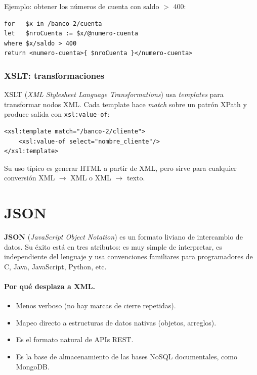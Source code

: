 \documentclass[11pt,a4paper]{article}
\begin{document}
Ejemplo: obtener los números de cuenta con saldo $>$ 400:

\begin{lstlisting}
for   $x in /banco-2/cuenta
let   $nroCuenta := $x/@numero-cuenta
where $x/saldo > 400
return <numero-cuenta>{ $nroCuenta }</numero-cuenta>
\end{lstlisting}

\subsubsection*{XSLT: transformaciones}

XSLT (\emph{XML Stylesheet Language Transformations}) usa
\emph{templates} para transformar nodos XML. Cada template hace
\emph{match} sobre un patrón XPath y produce salida con
\texttt{xsl:value-of}:

\begin{lstlisting}
<xsl:template match="/banco-2/cliente">
    <xsl:value-of select="nombre_cliente"/>
</xsl:template>
\end{lstlisting}

Su uso típico es generar HTML a partir de XML, pero sirve para cualquier
conversión XML $\rightarrow$ XML o XML $\rightarrow$ texto.

\section{JSON}

\textbf{JSON} (\emph{JavaScript Object Notation}) es un formato liviano
de intercambio de datos. Su éxito está en tres atributos: es muy simple
de interpretar, es independiente del lenguaje y usa convenciones
familiares para programadores de C, Java, JavaScript, Python, etc.

\paragraph{Por qué desplaza a XML.}
\begin{itemize}
    \item Menos verboso (no hay marcas de cierre repetidas).
    \item Mapeo directo a estructuras de datos nativas (objetos,
    arreglos).
    \item Es el formato natural de APIs REST.
    \item Es la base de almacenamiento de las bases NoSQL documentales,
    como MongoDB.
\end{itemize}
\end{document}

